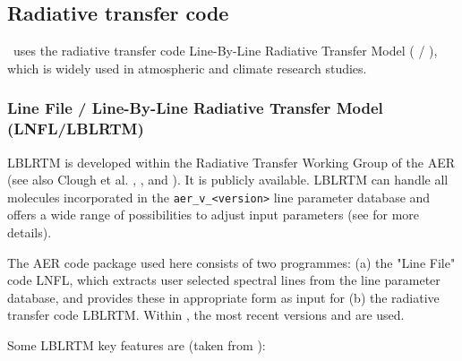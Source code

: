 
\subsection{Radiative transfer code}\label{sec:radcodes}
\mf\ uses the radiative transfer code Line-By-Line Radiative Transfer Model
(\lnflv{} / \lblrtmv), which is widely used in atmospheric and
climate research studies.

\subsubsection{Line File / Line-By-Line Radiative Transfer Model (LNFL/LBLRTM)}
\label{sec:lblrtm}
\ac{LBLRTM} is developed within the Radiative Transfer Working Group of the
\ac{AER} (see also Clough et al. \cite{CLO05}, \cite{AER}, and \cite{LBLRTM}).
It is publicly available. \ac{LBLRTM} can handle all molecules incorporated in
the {\tt aer\_v\_<version>} line parameter database \cite{LBLRTM} and offers a
wide range of possibilities to adjust input parameters (see
\cite{LBLRTM_instructions} for more details).

The \ac{AER} code package used here consists of two programmes: (a) the
"Line File" code \ac{LNFL}, which extracts user selected spectral lines from
the line parameter database, and provides these in appropriate form as input
for (b) the radiative transfer code \ac{LBLRTM}. Within \mf, the most recent
versions \lnflv{} and \lblrtmv{} are used.

Some \ac{LBLRTM} key features are (taken from \cite{LBLRTM}):

